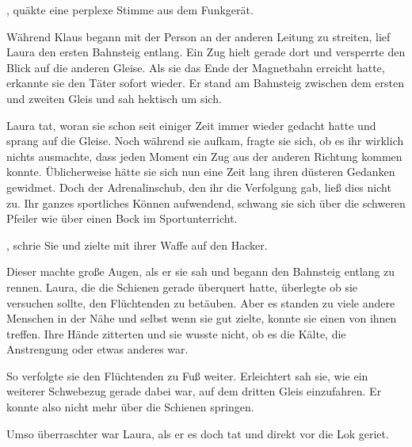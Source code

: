 \par

, quäkte eine perplexe Stimme aus dem Funkgerät. 

\par

Während Klaus begann mit der Person an der anderen Leitung zu streiten, lief Laura den ersten Bahnsteig entlang. Ein Zug hielt gerade dort und versperrte den Blick auf die anderen Gleise. Als sie das Ende der Magnetbahn erreicht hatte, erkannte sie den Täter sofort wieder. Er stand am Bahnsteig zwischen dem ersten und zweiten Gleis und sah hektisch um sich.

\par

Laura tat, woran sie schon seit einiger Zeit immer wieder gedacht hatte und sprang auf die Gleise. Noch während sie aufkam, fragte sie sich, ob es ihr wirklich nichts ausmachte, dass jeden Moment ein Zug aus der anderen Richtung kommen konnte. Üblicherweise hätte sie sich nun eine Zeit lang ihren düsteren Gedanken gewidmet. Doch der Adrenalinschub, den ihr die Verfolgung gab, ließ dies nicht zu. Ihr ganzes sportliches Können aufwendend, schwang sie sich über die schweren Pfeiler wie über einen Bock im Sportunterricht.

\par

, schrie Sie und zielte mit ihrer Waffe auf den Hacker.

\par

Dieser machte große Augen, als er sie sah und begann den Bahnsteig entlang zu rennen. Laura, die die Schienen gerade überquert hatte, überlegte ob sie versuchen sollte, den Flüchtenden zu betäuben. Aber es standen zu viele andere Menschen in der Nähe und selbst wenn sie gut zielte, konnte sie einen von ihnen treffen. Ihre Hände zitterten und sie wusste nicht, ob es die Kälte, die Anstrengung oder etwas anderes war.

\par

So verfolgte sie den Flüchtenden zu Fuß weiter. Erleichtert sah sie, wie ein weiterer Schwebezug gerade dabei war, auf dem dritten Gleis einzufahren. Er konnte also nicht mehr über die Schienen springen.

\par

Umso überraschter war Laura, als er es doch tat und direkt vor die Lok geriet.

